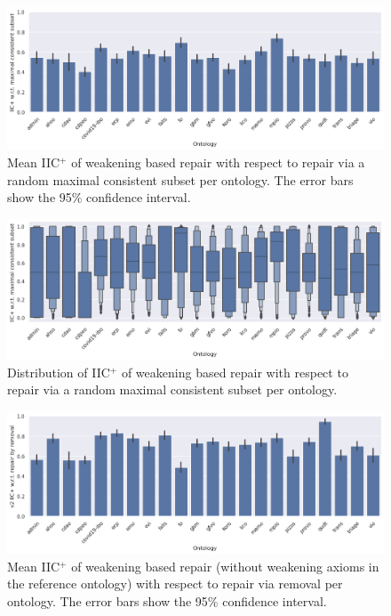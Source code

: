 \begin{figure}[ht]
  \centering
  \includegraphics[width=\textwidth]{resources/eiic-mcs-ontology-bar.png}
  \caption{Mean IIC$^+$ of weakening based repair with respect to repair via a random maximal consistent subset per ontology. The error bars show the 95\% confidence interval.}
\end{figure}

\begin{figure}[ht]
    \centering
    \includegraphics[width=\textwidth]{resources/eiic-mcs-ontology-violin.png}
    \caption{Distribution of IIC$^+$ of weakening based repair with respect to repair via a random maximal consistent subset per ontology.}
\end{figure}

\begin{figure}[ht]
  \centering
  \includegraphics[width=\textwidth]{resources/eiic-enhance-rem-ontology-bar.png}
  \caption{Mean IIC$^+$ of weakening based repair (without weakening axioms in the reference ontology) with respect to repair via removal per ontology. The error bars show the 95\% confidence interval.}
\end{figure}

